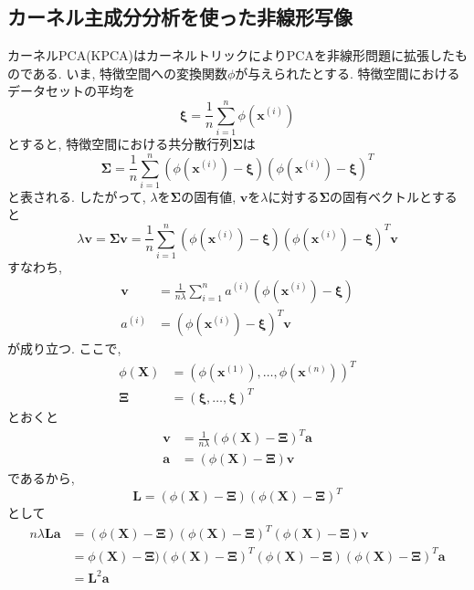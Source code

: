 \documentclass[uplatex]{jsarticle}
\theoremstyle{definition}
\numberwithin{equation}{section}
\begin{document}
\subsection{カーネル主成分分析を使った非線形写像}
カーネルPCA(KPCA)はカーネルトリックによりPCAを非線形問題に拡張したものである.
いま, 特徴空間への変換関数$\phi$が与えられたとする.
特徴空間におけるデータセットの平均を
\begin{equation}
    \bm{\xi} = \frac{1}{n}\sum_{i = 1}^{n} \phi(\bm{x}^{(i)})
\end{equation}
とすると, 特徴空間における共分散行列$\bm{\Sigma}$は
\begin{equation}
    \bm{\Sigma} = \frac{1}{n}\sum_{i = 1}^{n}(\phi(\bm{x}^{(i)}) - \bm{\xi})(\phi(\bm{x}^{(i)}) - \bm{\xi})^{T}
\end{equation}
と表される.
したがって, $\lambda$を$\bm{\Sigma}$の固有値, $\bm{v}$を$\lambda$に対する$\bm{\Sigma}$の固有ベクトルとすると
\begin{equation}
    \lambda\bm{v} = \bm{\Sigma}\bm{v} = \frac{1}{n}\sum_{i = 1}^{n}(\phi(\bm{x}^{(i)}) - \bm{\xi})(\phi(\bm{x}^{(i)}) - \bm{\xi})^{T}\bm{v}
\end{equation}
すなわち, 
\begin{align}
    \bm{v} &= \frac{1}{n\lambda}\sum_{i = 1}^{n}a^{(i)}(\phi(\bm{x}^{(i)}) - \bm{\xi}) \\
    a^{(i)} &= (\phi(\bm{x}^{(i)}) - \bm{\xi})^{T}\bm{v}
\end{align}
が成り立つ.
ここで, 
\begin{align}
    \phi(\bm{X}) &= (\phi(\bm{x}^{(1)}), \dots, \phi(\bm{x}^{(n)}))^{T} \\
    \bm{\Xi} &= (\bm{\xi}, \dots, \bm{\xi})^{T}
\end{align}
とおくと
\begin{align}
    \bm{v} &= \frac{1}{n\lambda}(\phi(\bm{X}) - \bm{\Xi})^{T}\bm{a} \\
    \bm{a} &= (\phi(\bm{X}) - \bm{\Xi})\bm{v}
\end{align}
であるから, 
\begin{equation}
    \bm{L} = (\phi(\bm{X}) - \bm{\Xi})(\phi(\bm{X}) - \bm{\Xi})^{T}
\end{equation}
として
\begin{align*}
    n\lambda\bm{L}\bm{a}
    &= (\phi(\bm{X}) - \bm{\Xi})(\phi(\bm{X}) - \bm{\Xi})^{T}(\phi(\bm{X}) - \bm{\Xi})\bm{v} \\
    &= \phi(\bm{X}) - \bm{\Xi})(\phi(\bm{X}) - \bm{\Xi})^{T}(\phi(\bm{X}) - \bm{\Xi})(\phi(\bm{X}) - \bm{\Xi})^{T}\bm{a} \\
    &= \bm{L}^{2}\bm{a}
\end{align*}
\end{document}
